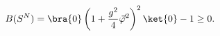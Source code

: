 \begin{equation}
B(S^N)=\bra{0}\left(1+\frac{g^2}{4}\vec{\varphi}^2\right)^2\ket{0}-1 \ge 0.\label{SNB}
\end{equation}

